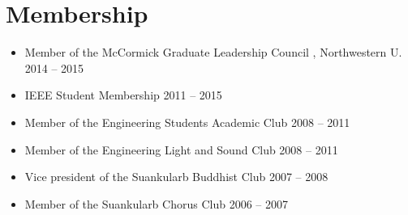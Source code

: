 \section{\sc Membership}

\begin{itemize}[leftmargin=0cm, label={}]
\item Member of the McCormick Graduate Leadership Council	, Northwestern U.	\hfill 2014 -- 2015
\item IEEE Student Membership \hfill 2011 -- 2015
\item Member of the Engineering Students Academic Club \hfill 2008 -- 2011
\item Member of the Engineering Light and Sound Club \hfill 2008 -- 2011
\item Vice president of the Suankularb Buddhist Club \hfill 2007 -- 2008
\item Member of the Suankularb Chorus Club \hfill 2006 -- 2007

\end{itemize}
